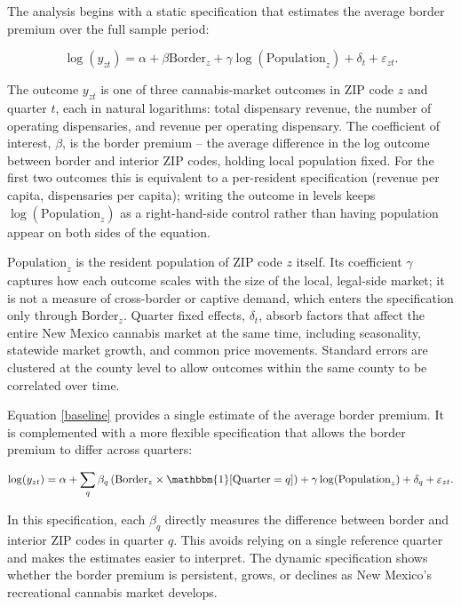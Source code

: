 \documentclass[12pt]{article}
\begin{document}
The analysis begins with a static specification that estimates the average border premium over the full sample period:

\begin{equation}
\label{baseline}
\log(y_{zt})=\alpha
+
\beta \text{Border}_z
+
\gamma \log(\text{Population}_z)
+
\delta_t
+
\varepsilon_{zt}.
\end{equation}

The outcome \(y_{zt}\) is one of three cannabis-market outcomes in ZIP code \(z\) and quarter \(t\), each in natural logarithms: total dispensary revenue, the number of operating dispensaries, and revenue per operating dispensary. The coefficient of interest, \(\beta\), is the border premium -- the average difference in the log outcome between border and interior ZIP codes, holding local population fixed. For the first two outcomes this is equivalent to a per-resident specification (revenue per capita, dispensaries per capita); writing the outcome in levels keeps \(\log(\text{Population}_z)\) as a right-hand-side control rather than having population appear on both sides of the equation.

\(\text{Population}_z\) is the resident population of ZIP code \(z\) itself. Its coefficient \(\gamma\) captures how each outcome scales with the size of the local, legal-side market; it is not a measure of cross-border or captive demand, which enters the specification only through \(\text{Border}_z\). Quarter fixed effects, \(\delta_t\), absorb factors that affect the entire New Mexico cannabis market at the same time, including seasonality, statewide market growth, and common price movements. Standard errors are clustered at the county level to allow outcomes within the same county to be correlated over time.

Equation \ref{baseline} provides a single estimate of the average border premium. It is complemented with a more flexible specification that allows the border premium to differ across quarters:

\begin{equation}
\label{baseline_dynamic}
\log(y_{zt})=
\alpha
+
\sum_q
\beta_q
\left(
\text{Border}_z
\times
\mathbbm{1}[\text{Quarter}=q]
\right)
+
\gamma \log(\text{Population}_z)
+
\delta_q
+
\varepsilon_{zt}.
\end{equation}

In this specification, each \(\beta_q\) directly measures the difference between border and interior ZIP codes in quarter \(q\). This avoids relying on a single reference quarter and makes the estimates easier to interpret. The dynamic specification shows whether the border premium is persistent, grows, or declines as New Mexico's recreational cannabis market develops.
\end{document}
